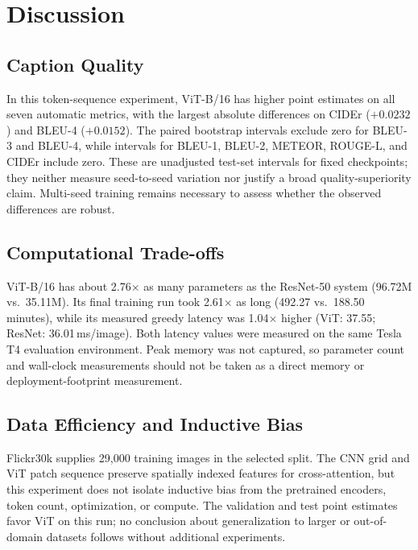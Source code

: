 \documentclass[conference]{IEEEtran}
\begin{document}
\section{Discussion}

\subsection{Caption Quality}

In this token-sequence experiment, ViT-B/16 has higher point estimates on all seven automatic metrics, with the largest absolute differences on CIDEr ($+0.0232$) and BLEU-4 ($+0.0152$). The paired bootstrap intervals exclude zero for BLEU-3 and BLEU-4, while intervals for BLEU-1, BLEU-2, METEOR, ROUGE-L, and CIDEr include zero. These are unadjusted test-set intervals for fixed checkpoints; they neither measure seed-to-seed variation nor justify a broad quality-superiority claim. Multi-seed training remains necessary to assess whether the observed differences are robust.

\subsection{Computational Trade-offs}

ViT-B/16 has about 2.76$\times$ as many parameters as the ResNet-50 system (96.72M vs.\ 35.11M). Its final training run took 2.61$\times$ as long (492.27 vs.\ 188.50 minutes), while its measured greedy latency was 1.04$\times$ higher (ViT: 37.55; ResNet: 36.01\,ms/image). Both latency values were measured on the same Tesla T4 evaluation environment. Peak memory was not captured, so parameter count and wall-clock measurements should not be taken as a direct memory or deployment-footprint measurement.

\subsection{Data Efficiency and Inductive Bias}

Flickr30k supplies 29{,}000 training images in the selected split. The CNN grid and ViT patch sequence preserve spatially indexed features for cross-attention, but this experiment does not isolate inductive bias from the pretrained encoders, token count, optimization, or compute. The validation and test point estimates favor ViT on this run; no conclusion about generalization to larger or out-of-domain datasets follows without additional experiments.
\end{document}

